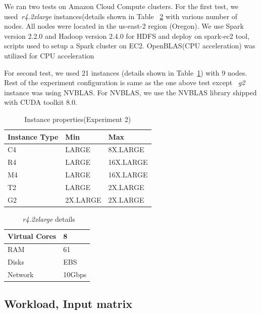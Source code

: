 \documentclass[10pt, conference, compsocconf]{IEEEtran}
\begin{document}
We ran two tests on Amazon Cloud Compute clusters. For the first test, we used~\textit{r4.2xlarge} instances(details shown in Table ~\ref{table:r4.2xlarge} with various number of nodes. All nodes were located in the us-east-2 region (Oregon). We use Spark version 2.2.0 and Hadoop version 2.4.0 for HDFS and deploy on spark-ec2 tool, scripts used to setup a Spark cluster on EC2. OpenBLAS(CPU acceleration) was utilized for CPU acceleration

For second test, we used 21 instances (details shown in Table~\ref{table:experiment-configuration}) with 9 nodes. Rest of the experiment configuration is same as the one above test except ~\textit{g2} instance was using NVBLAS. For NVBLAS, we use the NVBLAS library shipped with CUDA toolkit 8.0.  

\begin{table}
  \caption{\label{table:experiment-configuration}Instance properties(Experiment 2)}
\begin{center}
    \begin{tabular}{ | l | l | p{2.0cm} |}
    \hline
    Instance Type & Min  & Max   \\ \hline
    C4 & LARGE & 8X.LARGE  \\ \hline
    R4 & LARGE & 16X.LARGE  \\ \hline
    M4 & LARGE & 16X.LARGE  \\\hline
    T2 & LARGE & 2X.LARGE   \\\hline
    G2 & 2X.LARGE & 2X.LARGE    \\\hline
    \end{tabular}
\end{center}

\end{table}

\begin{table}
  \caption{\label{table:r4.2xlarge}~\textit{r4.2xlarge} details}
\begin{center}
    \begin{tabular}{ | l | p{1.0cm} |}
    \hline
    Virtual Cores & 8   \\ \hline
    RAM & 61   \\ \hline
    Disks & EBS   \\ \hline
    Network & 10Gbps   \\\hline
    \end{tabular}
\end{center}
\end{table}

\subsection{Workload, Input matrix}
\end{document}
